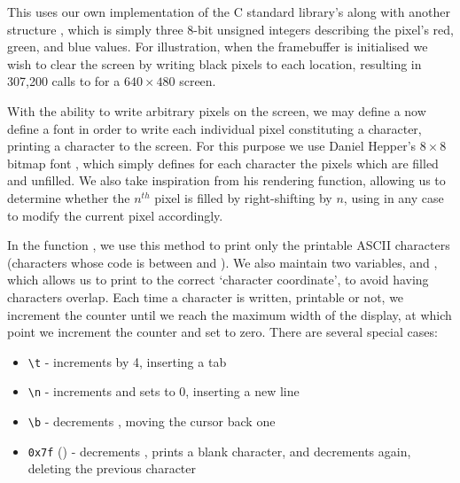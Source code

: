         This uses our own implementation of the C standard library's
         along with another structure , which is
        simply three 8-bit unsigned integers describing the pixel's red, green,
        and blue values. For illustration, when the framebuffer is initialised
        we wish to clear the screen by writing black pixels to each location,
        resulting in 307,200 calls to  for a $640\times480$
        screen.

        With the ability to write arbitrary pixels on the screen, we
        may define a now define a font in order to write each individual pixel
        constituting a character, printing a character to the screen. For this
        purpose we use Daniel Hepper's $8\times8$ bitmap font \cite{DHepper},
        which simply defines for each character the pixels which are filled and
        unfilled. We also take inspiration from his rendering function, allowing
        us to determine whether the $n^{th}$ pixel is filled by right-shifting
        by $n$, using  in any case to modify the current
        pixel accordingly.

        In the function , we use this method to print only the
        printable ASCII characters (characters whose code is between 
        and ). We also maintain two variables,  and
        , which allows us to print to the correct `character
        coordinate', to avoid having characters overlap. Each time a character
        is written, printable or not, we increment the  counter until
        we reach the maximum width of the display, at which point we increment
        the  counter and set  to zero. There are several
        special cases:
        \begin{itemize}
            \itemsep0em
            \item \verb|\t| - increments  by 4, inserting a tab
            \item \verb|\n| - increments  and sets  to
                0, inserting a new line
            \item \verb|\b| - decrements , moving the cursor back
                one
            \item \verb|0x7f| () - decrements , prints a
                blank character, and decrements  again, deleting
                the previous character
        \end{itemize}

